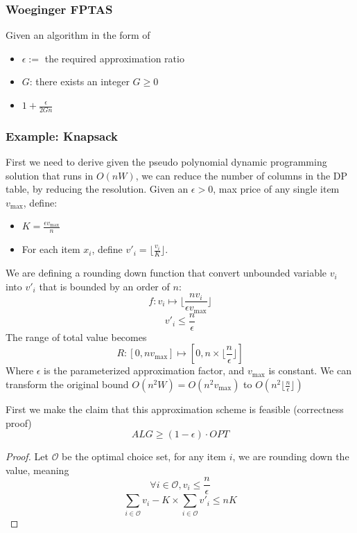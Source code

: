 \documentclass[10pt]{article}
\theoremstyle{definition}
\begin{document}
\subsubsection{Woeginger FPTAS}
Given an algorithm in the form of

\begin{algorithm}[H]
\end{algorithm}


\begin{itemize}
  \item $\epsilon :=$ the required approximation ratio
  \item $G$: there exists an integer $G \geq 0$
  \item $1 + \frac{\epsilon}{2Gn}$
\end{itemize}


\subsubsection*{Example: Knapsack}
First we need to derive 
given the pseudo polynomial dynamic programming solution that runs in $O(nW)$, we can reduce the number of columns 
in the DP table, by reducing the resolution. Given an $\epsilon > 0$, max price of any single item $v_{\max}$, define:
\begin{itemize}
  \item $K = \frac{\epsilon v_{\max}}{n}$
  \item For each item $x_i$, define $v'_i = \lfloor \frac{v_i}{K} \rfloor.$ 
\end{itemize}
We are defining a rounding down function that convert unbounded variable $v_i$ into $v'_i$ that is bounded by an order of $n$: 
\[f: v_i \mapsto \lfloor \frac{n v_i}{\epsilon v_{\max}}\rfloor \]
\[v'_i \leq \frac{n}{\epsilon}\]
The range of total value becomes 
\[R: [0, n v_{\max}] \mapsto [0, n \times \lfloor \frac{n }{\epsilon}\rfloor]\]
Where $\epsilon$ is the parameterized approximation factor, and $v_{\max}$ is constant.
We can transform the original bound $
 O(n^2 W) = O(n^2 v_{\max})$ to $O(n^2 \lfloor \frac{n}{\epsilon}\rfloor)$

First we make the claim that this approximation scheme is feasible (correctness proof)
\[ALG \geq (1 - \epsilon) \cdot OPT\]
\begin{proof}
  Let $\mathcal{O}$ be the optimal choice set, for any item $i$, we are rounding down the value, meaning 
  \[\forall i \in \mathcal{O}, v_i \leq \frac{n}{\epsilon}\]
  \[\sum_{i\in \mathcal{O}} v_i - K \times \sum_{i \in \mathcal{O}} v'_i \leq nK\]

\end{proof}
\end{document}
